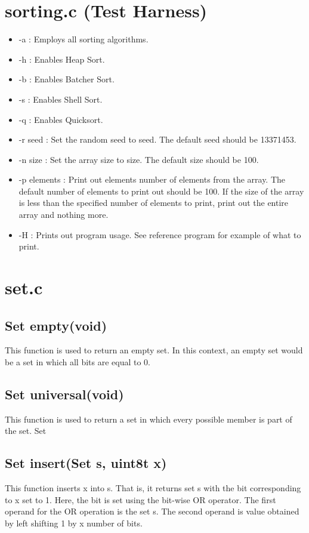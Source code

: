 \documentclass{article}
\begin{document}
\section{sorting.c (Test Harness)}
\begin{itemize}
    \item -a : Employs all sorting algorithms.
\item -h : Enables Heap Sort.
\item -b : Enables Batcher Sort.
\item -s : Enables Shell Sort.
\item -q : Enables Quicksort.
\item -r seed : Set the random seed to seed. The default seed should be 13371453.
\item -n size : Set the array size to size. The default size should be 100.
\item -p elements : Print out elements number of elements from the array. The default number of
elements to print out should be 100. If the size of the array is less than the specified number of
elements to print, print out the entire array and nothing more.
\item -H : Prints out program usage. See reference program for example of what to print.
\end{itemize}
\section{set.c} 
\subsection{Set empty(void)}
This function is used to return an empty set. In this context, an empty set would be a set in which all bits
are equal to 0.
\subsection{Set universal(void)}
This function is used to return a set in which every possible member is part of the set.
Set
\subsection{Set insert(Set s, uint8\textunderscore t x)}
This function inserts x into s. That is, it returns set s with the bit corresponding to x set to 1. Here, the
bit is set using the bit-wise OR operator. The first operand for the OR operation is the set s. The second
operand is value obtained by left shifting 1 by x number of bits.
\end{document}
